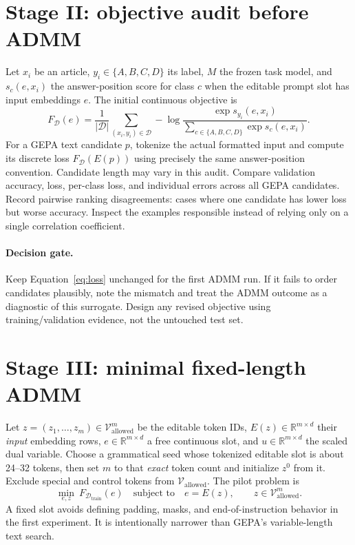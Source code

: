 \documentclass[11pt]{article}
\newcommand{\D}{\mathcal D}
\newcommand{\V}{\mathcal V}
\begin{document}
\section{Stage II: objective audit before ADMM}
Let $x_i$ be an article, $y_i\in\{A,B,C,D\}$ its label, $M$ the frozen task model, and $s_c(e,x_i)$ the answer-position score for class $c$ when the editable prompt slot has input embeddings $e$. The initial continuous objective is
\begin{equation}
F_{\D}(e)=\frac{1}{|\D|}\sum_{(x_i,y_i)\in\D}
  -\log\frac{\exp s_{y_i}(e,x_i)}
  {\sum_{c\in\{A,B,C,D\}}\exp s_c(e,x_i)}.
\label{eq:loss}
\end{equation}
For a GEPA text candidate $p$, tokenize the actual formatted input and compute its discrete loss $F_{\D}(E(p))$ using precisely the same answer-position convention. Candidate length may vary in this audit. Compare validation accuracy, loss, per-class loss, and individual errors across all GEPA candidates. Record pairwise ranking disagreements: cases where one candidate has lower loss but worse accuracy. Inspect the examples responsible instead of relying only on a single correlation coefficient.

\paragraph{Decision gate.} Keep Equation~\eqref{eq:loss} unchanged for the first ADMM run. If it fails to order candidates plausibly, note the mismatch and treat the ADMM outcome as a diagnostic of this surrogate. Design any revised objective using training/validation evidence, not the untouched test set.

\section{Stage III: minimal fixed-length ADMM}
Let $z=(z_1,\ldots,z_m)\in\V_{\mathrm{allowed}}^m$ be the editable token IDs, $E(z)\in\mathbb R^{m\times d}$ their \emph{input} embedding rows, $e\in\mathbb R^{m\times d}$ a free continuous slot, and $u\in\mathbb R^{m\times d}$ the scaled dual variable. Choose a grammatical seed whose tokenized editable slot is about 24--32 tokens, then set $m$ to that \emph{exact} token count and initialize $z^0$ from it. Exclude special and control tokens from $\V_{\mathrm{allowed}}$. The pilot problem is
\begin{equation}
\min_{e,z}\ F_{\D_{\mathrm{train}}}(e)
\quad\text{subject to}\quad e=E(z),\qquad z\in\V_{\mathrm{allowed}}^m.
\label{eq:constrained}
\end{equation}
A fixed slot avoids defining padding, masks, and end-of-instruction behavior in the first experiment. It is intentionally narrower than GEPA's variable-length text search.
\end{document}
